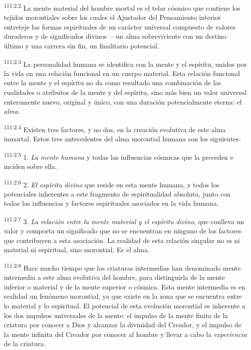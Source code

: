 \par
\textsuperscript{111:2.2} La mente material del hombre mortal es el telar cósmico que contiene los tejidos morontiales sobre los cuales el Ajustador del Pensamiento interior entreteje las formas espirituales de un carácter universal compuesto de valores duraderos y de significados divinos ---un alma sobreviviente con un destino último y una carrera sin fin, un finalitario potencial.

\par
\textsuperscript{111:2.3} La personalidad humana se identifica con la mente y el espíritu, unidos por la vida en una relación funcional en un cuerpo material. Esta relación funcional entre la mente y el espíritu no da como resultado una combinación de las cualidades o atributos de la mente y del espíritu, sino más bien un valor universal enteramente nuevo, original y único, con una duración potencialmente eterna: el \textit{alma}.

\par
\textsuperscript{111:2.4} Existen tres factores, y no dos, en la creación evolutiva de este alma inmortal. Estos tres antecedentes del alma morontial humana son los siguientes:

\par
\textsuperscript{111:2.5} 1. \textit{La mente humana} y todas las influencias cósmicas que la preceden e inciden sobre ella.

\par
\textsuperscript{111:2.6} 2. \textit{El espíritu divino} que reside en esta mente humana, y todos los potenciales inherentes a este fragmento de espiritualidad absoluta, junto con todas las influencias y factores espirituales asociados en la vida humana.

\par
\textsuperscript{111:2.7} 3. \textit{La relación entre la mente material y el espíritu divino}, que conlleva un valor y comporta un significado que no se encuentran en ninguno de los factores que contribuyen a esta asociación. La realidad de esta relación singular no es ni material ni espiritual, sino morontial. Es el alma.

\par
\textsuperscript{111:2.8} Hace mucho tiempo que las criaturas intermedias han denominado mente intermedia a este alma evolutiva del hombre, para distinguirla de la mente inferior o material y de la mente superior o cósmica. Esta mente intermedia es en realidad un fenómeno morontial, ya que existe en la zona que se encuentra entre lo material y lo espiritual. El potencial de esta evolución morontial es inherente a los dos impulsos universales de la mente: el impulso de la mente finita de la criatura por conocer a Dios y alcanzar la divinidad del Creador, y el impulso de la mente infinita del Creador por conocer al hombre y llevar a cabo la \textit{experiencia} de la criatura.


